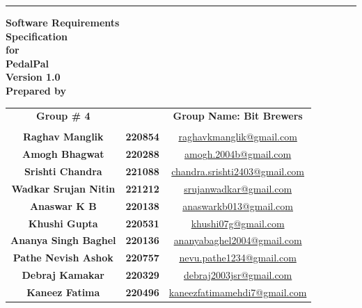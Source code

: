 \documentclass{scrreprt}
\begin{document}
\begin{titlingpage}
\begin{flushright}
    \rule{16cm}{5pt}\vskip1cm
    \textbf{{\fontsize{40}{48}\selectfont Software Requirements}\\ {\fontsize{40}{48}\selectfont Specification}\\\vspace{1cm}\huge{for}\\\vspace{1cm}\Huge{PedalPal}\\ \vspace{1.5cm}\huge{Version 1.0}\\\vspace{1cm}\huge{Prepared by}}
\end{flushright}
\vspace{1.0cm}
\large{\begin{tabular*}{\columnwidth}{@{\extracolsep{\stretch{1}}}*{3}{c}@{}}
    \Large{\textbf{Group \# 4}} & & \Large{\textbf{Group Name: Bit Brewers}} \\
    \\
    \textbf{Raghav Manglik} & \textbf{220854} & \href{mailto:raghavkmanglik@gmail.com}{raghavkmanglik@gmail.com} \\
    \textbf{Amogh Bhagwat} & \textbf{220288} & \href{mailto:amogh.2004b@gmail.com}{amogh.2004b@gmail.com} \\
    \textbf{Srishti Chandra} & \textbf{221088} & \href{mailto:chandra.srishti2403@gmail.com}{chandra.srishti2403@gmail.com} \\
    \textbf{Wadkar Srujan Nitin} & \textbf{221212} & \href{mailto:srujanwadkar@gmail.com}{srujanwadkar@gmail.com} \\
    \textbf{Anaswar K B} & \textbf{220138} & \href{mailto:anaswarkb013@gmail.com}{anaswarkb013@gmail.com} \\
    \textbf{Khushi Gupta} & \textbf{220531} & \href{mailto:khushi07g@gmail.com}{khushi07g@gmail.com} \\
    \textbf{Ananya Singh Baghel} & \textbf{220136} & \href{mailto:ananyabaghel2004@gmail.com}{ananyabaghel2004@gmail.com} \\
    \textbf{Pathe Nevish Ashok} & \textbf{220757} & \href{mailto:nevu.pathe1234@gmail.com}{nevu.pathe1234@gmail.com} \\
    \textbf{Debraj Kamakar} & \textbf{220329} & \href{mailto:debraj2003jsr@gmail.com}{debraj2003jsr@gmail.com} \\
    \textbf{Kaneez Fatima} & \textbf{220496} & \href{mailto:kaneezfatimamehdi7@gmail.com}{kaneezfatimamehdi7@gmail.com} \\
    

\end{tabular*}}
\end{titlingpage}
\end{document}
